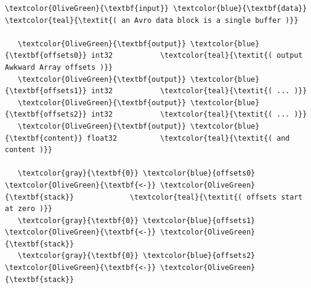 \documentclass{webofc}
\begin{document}
\small
\begin{Verbatim}[commandchars=\\\{\}]
   \textcolor{OliveGreen}{\textbf{input}} \textcolor{blue}{\textbf{data}}                      \textcolor{teal}{\textit{( an Avro data block is a single buffer )}}

   \textcolor{OliveGreen}{\textbf{output}} \textcolor{blue}{\textbf{offsets0}} int32           \textcolor{teal}{\textit{( output Awkward Array offsets )}}
   \textcolor{OliveGreen}{\textbf{output}} \textcolor{blue}{\textbf{offsets1}} int32           \textcolor{teal}{\textit{( ... )}}
   \textcolor{OliveGreen}{\textbf{output}} \textcolor{blue}{\textbf{offsets2}} int32           \textcolor{teal}{\textit{( ... )}}
   \textcolor{OliveGreen}{\textbf{output}} \textcolor{blue}{\textbf{content}} float32          \textcolor{teal}{\textit{( and content )}}

   \textcolor{gray}{\textbf{0}} \textcolor{blue}{offsets0} \textcolor{OliveGreen}{\textbf{<-}} \textcolor{OliveGreen}{\textbf{stack}}             \textcolor{teal}{\textit{( offsets start at zero )}}
   \textcolor{gray}{\textbf{0}} \textcolor{blue}{offsets1} \textcolor{OliveGreen}{\textbf{<-}} \textcolor{OliveGreen}{\textbf{stack}}
   \textcolor{gray}{\textbf{0}} \textcolor{blue}{offsets2} \textcolor{OliveGreen}{\textbf{<-}} \textcolor{OliveGreen}{\textbf{stack}}


\end{Verbatim}
\end{document}

